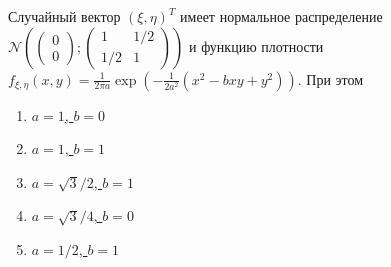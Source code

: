 \documentclass[t]{beamer}
\newcommand{\cN}{\mathcal{N}}
\begin{document}
 \begin{frame} \label{26} 
\begin{block}{26} 

  Случайный вектор $(\xi, \eta)^T$ имеет нормальное распределение
  $\cN \left(
  \begin{pmatrix}
    0 \\
    0
  \end{pmatrix};
  \begin{pmatrix}
    1 & 1/2 \\
    1/2 & 1
  \end{pmatrix}
\right)$ и функцию плотности $f_{\xi, \eta}(x, y) = \frac{1}{2\pi a} \exp\left(-\frac{1}{2a^2}(x^2-bxy+y^2) \right)$. При этом

  


 \end{block} 
\begin{enumerate} 
\item[] \hyperlink{26-No}{\beamergotobutton{} $a=1$, $b=0$}
\item[] \hyperlink{26-No}{\beamergotobutton{} $a=1$, $b=1$}
\item[] \hyperlink{26-Yes}{\beamergotobutton{} $a=\sqrt3/2$, $b=1$}
\item[] \hyperlink{26-No}{\beamergotobutton{} $a=\sqrt3/4$, $b=0$}
\item[] \hyperlink{26-No}{\beamergotobutton{} $a=1/2$, $b=1$}
\end{enumerate} 
\end{frame} 
\end{document}
